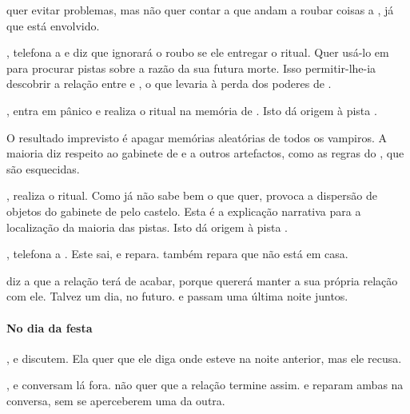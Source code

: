  quer evitar problemas, mas não quer contar a  que andam a roubar coisas a , já que  está envolvido.

,  telefona a  e diz que ignorará o roubo se ele entregar o ritual. Quer usá-lo em  para procurar pistas sobre a razão da sua futura morte. Isso permitir-lhe-ia descobrir a relação entre  e , o que levaria à perda dos poderes de .

,  entra em pânico e realiza o ritual na memória de . Isto dá origem à pista .

O resultado imprevisto é apagar memórias aleatórias de todos os vampiros. A maioria diz respeito ao gabinete de  e a outros artefactos, como as regras do , que são esquecidas.

,  realiza o ritual. Como já não sabe bem o que quer, provoca a dispersão de objetos do gabinete de  pelo castelo. Esta é a explicação narrativa para a localização da maioria das pistas. Isto dá origem à pista .

,  telefona a . Este sai, e  repara.  também repara que  não está em casa.

 diz a  que a relação terá de acabar, porque  quererá manter a sua própria relação com ele. Talvez um dia, no futuro.  e  passam uma última noite juntos.

\paragraph{No dia da festa}

,  e  discutem. Ela quer que ele diga onde esteve na noite anterior, mas ele recusa.

,  e  conversam lá fora.  não quer que a relação termine assim.  e  reparam ambas na conversa, sem se aperceberem uma da outra.

